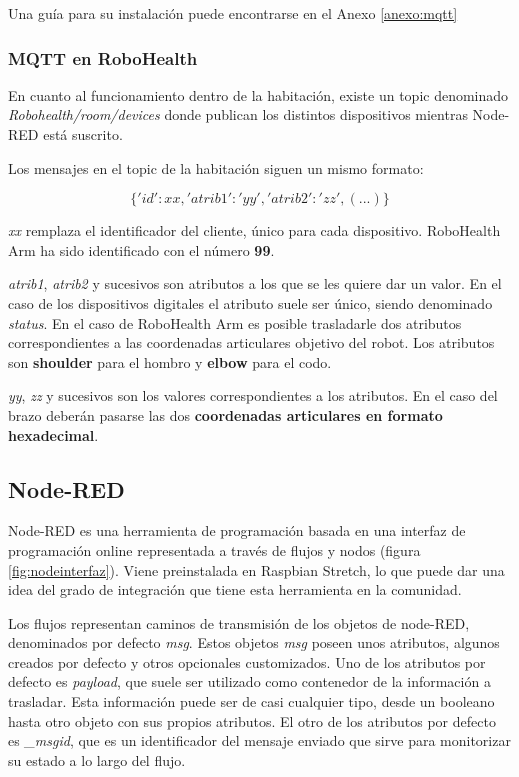 Una guía para su instalación puede encontrarse en el Anexo \ref{anexo:mqtt}

\subsubsection{MQTT en RoboHealth}

En cuanto al funcionamiento dentro de la habitación, existe un topic denominado \textit{Robohealth/room/devices} donde publican los distintos dispositivos mientras Node-RED está suscrito.

Los mensajes en el topic de la habitación siguen un mismo formato:

$$\{'id':xx,'atrib1':'yy','atrib2':'zz',(...)\}$$

\textit{xx} remplaza el identificador del cliente, único para cada dispositivo. RoboHealth Arm ha sido identificado con el número \textbf{99}.

\textit{atrib1}, \textit{atrib2} y sucesivos son atributos a los que se les quiere dar un valor. En el caso de los dispositivos digitales el atributo suele ser único, siendo denominado \textit{status}. En el caso de RoboHealth Arm es posible trasladarle dos atributos correspondientes a las coordenadas articulares objetivo del robot. Los atributos son \textbf{shoulder} para el hombro y \textbf{elbow} para el codo.

\textit{yy}, \textit{zz} y sucesivos son los valores correspondientes a los atributos. En el caso del brazo deberán pasarse las dos \textbf{coordenadas articulares en formato hexadecimal}.

\subsection{Node-RED}

Node-RED es una herramienta de programación basada en una interfaz de programación online representada a través de flujos y nodos (figura \ref{fig:nodeinterfaz}). Viene preinstalada en Raspbian Stretch, lo que puede dar una idea del grado de integración que tiene esta herramienta en la comunidad.

Los flujos representan caminos de transmisión de los objetos de node-RED, denominados por defecto \textit{msg}. Estos objetos \textit{msg} poseen unos atributos, algunos creados por defecto y otros opcionales customizados. Uno de los atributos por defecto es \textit{payload}, que suele ser utilizado como contenedor de la información a trasladar. Esta información puede ser de casi cualquier tipo, desde un booleano hasta otro objeto con sus propios atributos. El otro de los atributos por defecto es \textit{\_msgid}, que es un identificador del mensaje enviado que sirve para monitorizar su estado a lo largo del flujo.

